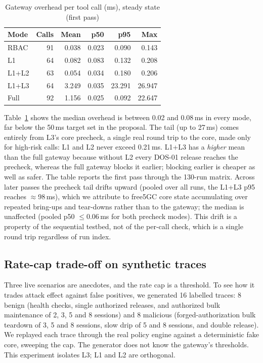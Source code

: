 \documentclass[conference]{IEEEtran}
\begin{document}
\begin{table}[t]
\centering
\caption{Gateway overhead per tool call (ms), steady state (first pass)}
\label{tab:latency}
\begin{tabular}{@{}lrrrrr@{}}
\toprule
Mode & Calls & Mean & p50 & p95 & Max \\
\midrule
RBAC   & 91 & 0.038 & 0.023 & 0.090 & 0.143 \\
L1     & 64 & 0.082 & 0.083 & 0.132 & 0.208 \\
L1+L2  & 63 & 0.054 & 0.034 & 0.180 & 0.206 \\
L1+L3  & 64 & 3.249 & 0.035 & 23.291 & 26.947 \\
Full   & 92 & 1.156 & 0.025 & 0.092 & 22.647 \\
\bottomrule
\end{tabular}
\end{table}

Table~\ref{tab:latency} shows the median overhead is between 0.02 and 0.08\,ms in every mode,
far below the 50\,ms target set in the proposal. The tail (up to 27\,ms) comes entirely from
L3's core precheck, a single real round trip to the core, made only for high-risk calls:
L1 and L2 never exceed 0.21\,ms. L1+L3 has a \emph{higher} mean than the full gateway because
without L2 every DOS-01 release reaches the precheck, whereas the full gateway blocks it
earlier; blocking earlier is cheaper as well as safer. The table reports the first pass through
the 130-run matrix. Across later passes the precheck tail drifts upward (pooled over all runs,
the L1+L3 p95 reaches $\approx$98\,ms), which we attribute to free5GC core state accumulating
over repeated bring-ups and tear-downs rather than to the gateway; the median is unaffected
(pooled p50 $\le$0.06\,ms for both precheck modes). This drift is a property of the sequential testbed, not of the
per-call check, which is a single round trip regardless of run index.

\subsection{Rate-cap trade-off on synthetic traces}

Three live scenarios are anecdotes, and the rate cap is a threshold. To see how it trades
attack effect against false positives, we generated 16 labelled traces: 8 benign (health
checks, single authorized releases, and authorized bulk maintenance of 2, 3, 5 and 8
sessions) and 8 malicious (forged-authorization bulk teardown of 3, 5 and 8 sessions, slow
drip of 5 and 8 sessions, and double release). We replayed each trace through the real
policy engine against a deterministic fake core, sweeping the cap. The generator does not
know the gateway's thresholds. This experiment isolates L3; L1 and L2 are orthogonal.
\end{document}
